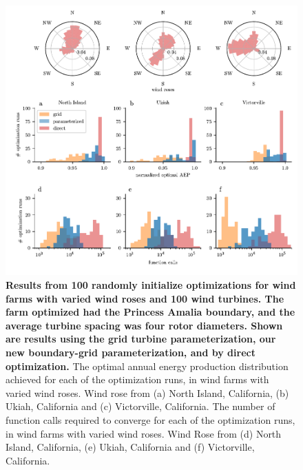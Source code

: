 \documentclass[wes, manuscript]{copernicus}
\begin{document}
\begin{figure}
\centering
\includegraphics{paper-figures/results_rosesR1.pdf}
\caption{\textbf{Results from 100 randomly initialize optimizations for wind farms with varied wind roses and 100 wind turbines. The farm optimized had the Princess Amalia boundary, and the average turbine spacing was four rotor diameters. Shown are results using the grid turbine parameterization, our new boundary-grid parameterization, and by direct optimization.} The optimal annual energy production distribution achieved for each of the optimization runs, in wind farms with varied wind roses.  Wind rose from (a) North Island, California, (b) Ukiah, California and (c) Victorville, California. The number of function calls required to converge for each of the optimization runs, in wind farms with varied wind roses. Wind Rose from (d) North Island, California, (e) Ukiah, California and (f) Victorville, California. }
\label{results-roses}
\end{figure}
\end{document}
